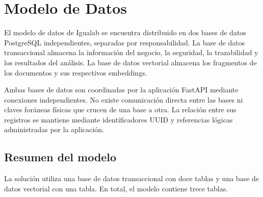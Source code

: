 

\section{Modelo de Datos}

El modelo de datos de Igualab se encuentra distribuido en dos bases de
datos PostgreSQL independientes, separadas por responsabilidad. La base
de datos transaccional almacena la información del negocio, la seguridad,
la trazabilidad y los resultados del análisis. La base de datos vectorial
almacena los fragmentos de los documentos y sus respectivos embeddings.

Ambas bases de datos son coordinadas por la aplicación FastAPI mediante
conexiones independientes. No existe comunicación directa entre las bases
ni claves foráneas físicas que crucen de una base a otra. La relación entre
sus registros se mantiene mediante identificadores UUID y referencias
lógicas administradas por la aplicación.



\subsection{Resumen del modelo}

La solución utiliza una base de datos transaccional con doce tablas y una
base de datos vectorial con una tabla. En total, el modelo contiene trece
tablas.

